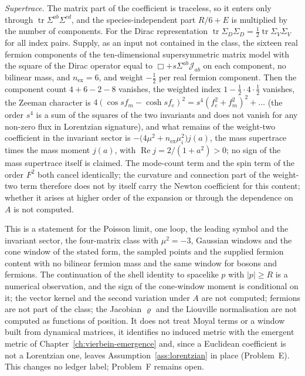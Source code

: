 \emph{Supertrace.} The matrix part of the coefficient is traceless, so it enters only through \(\operatorname{tr}\Sigma^{ab}\Sigma^{cd}\), and the species-independent part \(R/6+E\) is multiplied by the number of components. For the Dirac representation \(\operatorname{tr}\Sigma_D\Sigma_D=\tfrac12\operatorname{tr}\Sigma_V\Sigma_V\) for all index pairs. Supply, as an input not contained in the class, the sixteen real fermion components of the ten-dimensional supersymmetric matrix model with the square of the Dirac operator equal to \(\Box+s\Sigma^{ab}\mathcal J_{ab}\) on each component, no bilinear mass, and \(n_{\mathrm{ex}}=6\), and weight \(-\tfrac12\) per real fermion component. Then the component count \(4+6-2-8\) vanishes, the weighted index \(1-\tfrac12\cdot4\cdot\tfrac12\) vanishes, the Zeeman character is \(4(\cos sf_m-\cosh sf_e)^2=s^4(f_e^2+f_m^2)^2+\dots\) (the order \(s^4\) is a sum of the squares of the two invariants and does not vanish for any non-zero flux in Lorentzian signature), and what remains of the weight-two coefficient in the invariant sector is \(-\bigl(4\mu^2+n_{\mathrm{ex}}\mu_i^2\bigr)j(a)\), the mass supertrace times the mass moment \(j(a)\), with \(\operatorname{Re}j=2/(1+a^2)>0\); no sign of the mass supertrace itself is claimed. The mode-count term and the spin term of the order \(F^2\) both cancel identically; the curvature and connection part of the weight-two term therefore does not by itself carry the Newton coefficient for this content; whether it arises at higher order of the expansion or through the dependence on \(A\) is not computed.

This is a statement for the Poisson limit, one loop, the leading symbol and the invariant sector, the four-matrix class with \(\mu^2=-3\), Gaussian windows and the cone window of the stated form, the sampled points and the supplied fermion content with no bilinear fermion mass and the same window for bosons and fermions. The continuation of the shell identity to spacelike \(p\) with \(|p|\ge R\) is a numerical observation, and the sign of the cone-window moment is conditional on it; the vector kernel and the second variation under \(A\) are not computed; fermions are not part of the class; the Jacobian \(\varrho\) and the Liouville normalisation are not computed as functions of position. It does not treat Moyal terms or a window built from dynamical matrices, it identifies no induced metric with the emergent metric of Chapter~\ref{ch:vierbein-emergence} and, since a Euclidean coefficient is not a Lorentzian one, leaves Assumption~\ref{ass:lorentzian} in place (Problem~E). This changes no ledger label; Problem~F remains open.

